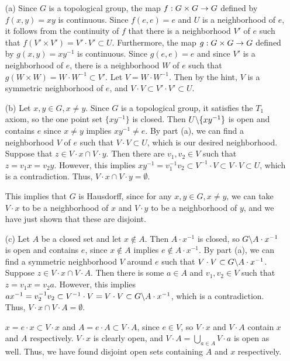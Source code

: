 \documentclass{hmwk}
\begin{document}
\begin{solution}
\begin{itemize}
    \item[(a)] Since $G$ is a topological group, the map $f: G \times G \rightarrow G$ defined by $f(x, y) = xy$ is continuous. Since $f(e, e) = e$ and $U$ is a neighborhood of $e$, it follows from the continuity of $f$ that there is a neighborhood $V'$ of $e$ such that $f(V' \times V') = V'\cdot V'\subset U$. Furthermore, the map $g: G \times G \rightarrow G$ defined by $g(x, y) = xy^{-1}$ is continuous. Since $g(e, e) = e$ and since $V'$ is a neighborhood of $e$, there is a neighborhood $W$ of $e$ such that $g(W \times W) = W \cdot W^{-1} \subset V'$. Let $V = W \cdot W^{-1}$. Then by the hint, $V$ is a symmetric neighborhood of $e$, and $V \cdot V \subset V' \cdot V' \subset U$. 

    \item[(b)] Let $x, y \in G, x \neq y$. Since $G$ is a topological group, it satisfies the $T_1$ axiom, so the one point set $\{xy^{-1}\}$ is closed. Then $U \backslash \{xy^{-1}\}$ is open and contains $e$ since $x \neq y$ implies $xy^{-1} \neq e$. By part (a), we can find a neighborhood $V$ of $e$ such that $V \cdot V \subset U$, which is our desired neighborhood. Suppose that $z \in V \cdot x \cap V \cdot y$. Then there are $v_1, v_2 \in V$ such that $z = v_1x = v_2y$. However, this implies $xy^{-1} = v_1^{-1} v_2\subset V^{-1}\cdot V \subset V \cdot V \subset U$, which is a contradiction. Thus, $V \cdot x \cap V \cdot y = \emptyset$. 

    \pre This implies that $G$ is Hausdorff, since for any $x, y \in G, x \neq y$, we can take $V\cdot x$ to be a neighborhood of $x$ and $V \cdot y$ to be a neighborhood of $y$, and we have just shown that these are disjoint. 

    \item[(c)] Let $A$ be a closed set and let $x \notin A$. Then $A \cdot x^{-1}$ is closed, so $G \backslash A \cdot x^{-1}$ is open and contains $e$, since $x \notin A$ implies $e \notin A\cdot x^{-1}$. By part (a), we can find a symmetric neighborhood $V$ around $e$ such that $V \cdot V \subset G \backslash A \cdot x^{-1}$. Suppose $z \in V \cdot x \cap V \cdot A$. Then there is some $a \in A$ and $v_1, v_2 \in V$ such that $z = v_1x = v_2a$. However, this implies $ax^{-1} = v_2^{-1}v_2 \subset V^{-1}\cdot V = V \cdot V \subset G \backslash A \cdot x^{-1}$, which is a contradiction. Thus, $V \cdot x \cap V \cdot A = \emptyset$.
    
    \pre $x = e \cdot x \subset V \cdot x$ and $A = e \cdot A \subset V \cdot A$, since $e \in V$, so $V\cdot x$ and $V \cdot A$ contain $x$ and $A$ respectively. $V \cdot x$ is clearly open, and $V \cdot A = \bigcup_{a \in A} V \cdot a$ is open as well. Thus, we have found disjoint open sets containing $A$ and $x$ respectively. 


\end{itemize}
\end{solution}
\end{document}

